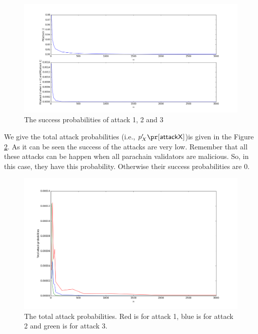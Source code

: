 \begin{figure}[h]\centering
	  \includegraphics[width=16cm]{images/attack123.png}
	  \caption{The success probabilities of attack 1, 2 and 3}
	  \label{fig:attack123}
\end{figure}


We give the total attack probabilities (i.e., $p'_X\pr[\mathsf{attack X}]$)is given in the Figure \ref{fig:total}. As it can be seen the success of the attacks are very low. Remember that all these attacks can be happen when all parachain validators are malicious. So, in this case, they have this probability. Otherwise their success probabilities are 0.

\begin{figure}[h]\centering
	  \includegraphics[width=16cm]{images/totalattack.png}
	  \caption{The total attack probabilities. Red is for attack 1, blue is for attack 2 and green is for attack 3.}
	  \label{fig:total}
\end{figure}










